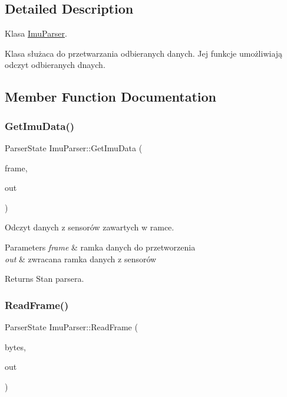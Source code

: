 \subsection{Detailed Description}
Klasa \mbox{\hyperlink{class_imu_parser}{Imu\+Parser}}. 

Klasa służaca do przetwarzania odbieranych danych. Jej funkcje umożliwiają odczyt odbieranych dnaych. 

\subsection{Member Function Documentation}
\mbox{\label{class_imu_parser_abd16c928d85e81a5dd475befdb604c9b}} 
\subsubsection{\texorpdfstring{GetImuData()}{GetImuData()}}
{\footnotesize\ttfamily Parser\+State Imu\+Parser\+::\+Get\+Imu\+Data (\begin{DoxyParamCaption}\item[{\mbox{\hyperlink{struct_imu_frame}{Imu\+Frame}} \&}]{frame,  }\item[{\mbox{\hyperlink{struct_imu_data}{Imu\+Data}} \&}]{out }\end{DoxyParamCaption})\hspace{0.3cm}{\ttfamily [static]}}



Odczyt danych z sensorów zawartych w ramce. 


\begin{DoxyParams}{Parameters}
{\em frame} & ramka danych do przetworzenia \\
\hline
{\em out} & zwracana ramka danych z sensorów \\
\hline
\end{DoxyParams}
\begin{DoxyReturn}{Returns}
Stan parsera. 
\end{DoxyReturn}
\mbox{\label{class_imu_parser_ac1e6cd15ce85021883c68fcee7c5cb55}} 
\subsubsection{\texorpdfstring{ReadFrame()}{ReadFrame()}}
{\footnotesize\ttfamily Parser\+State Imu\+Parser\+::\+Read\+Frame (\begin{DoxyParamCaption}\item[{Q\+Byte\+Array \&}]{bytes,  }\item[{\mbox{\hyperlink{struct_imu_frame}{Imu\+Frame}} \&}]{out }\end{DoxyParamCaption})\hspace{0.3cm}{\ttfamily [static]}}



